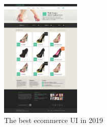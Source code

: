 \documentclass{article}
\begin{document}
\blindtext

\blindtext

\begin{figure}
\centering
\includegraphics[width=1.5in, angle=90]{demo.jpg}
    \caption{The best ecommerce UI in 2019\label{latexpic}}
\end{figure}


\blindtext

\blindtext

\blindtext

\blindtext
\end{document}
